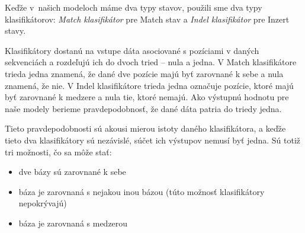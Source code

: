 
Keďže v~našich modeloch máme dva typy stavov, použili sme dva typy klasifikátorov: \textit{Match klasifikátor} pre Match stav a \textit{Indel klasifikátor} pre Inzert stavy.

Klasifikátory dostanú na vstupe dáta asociované s pozíciami v daných sekvenciách a rozdeľujú ich do dvoch tried -- nula a jedna. V Match klasifikátore trieda jedna znamená, že dané dve pozície majú byť zarovnané k sebe a nula znamená, že nie. V Indel klasifikátore trieda jedna označuje pozície, ktoré majú byť zarovnané k medzere a nula tie, ktoré nemajú. Ako výstupnú hodnotu pre naše modely berieme pravdepodobnosť, že dané dáta patria do triedy jedna.

Tieto pravdepodobnosti sú akousi mierou istoty daného klasifikátora, a keďže tieto dva klasifikátory sú nezávislé, súčet ich výstupov nemusí byť jedna. Sú totiž tri možnosti, čo sa môže stať:
\begin{itemize}
    \item dve bázy sú zarovnané k sebe
    \item báza je zarovnaná s nejakou inou bázou (túto možnosť klasifikátory nepokrývajú)
    \item báza je zarovnaná s medzerou
\end{itemize}

